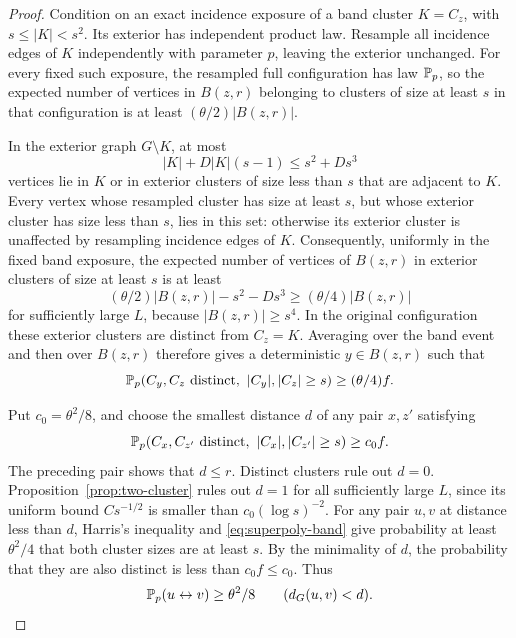 \begin{proof}
Condition on an exact incidence exposure of a band cluster
$K=C_z$, with $s\le|K|<s^2$. Its exterior has independent product law.
Resample all incidence edges of $K$ independently with parameter $p$,
leaving the exterior unchanged. For every fixed such exposure, the
resampled full configuration has law $\mathbb P_p$, so the expected number
of vertices in $B(z,r)$ belonging to clusters of size at least $s$
in that configuration is at least
$(\theta/2)|B(z,r)|$.

In the exterior graph $G\setminus K$, at most
\[
 |K|+D|K|(s-1)\le s^2+Ds^3
\]
vertices lie in $K$ or in exterior clusters of size less than $s$
that are adjacent to $K$. Every vertex whose resampled cluster has
size at least $s$, but whose exterior cluster has size less than $s$,
lies in this set: otherwise its exterior cluster is unaffected by
resampling incidence edges of $K$. Consequently, uniformly in the
fixed band exposure, the expected number of vertices of $B(z,r)$
in exterior clusters of size at least $s$ is at least
\[
 (\theta/2)|B(z,r)|-s^2-Ds^3
 \ge(\theta/4)|B(z,r)|
\]
for sufficiently large $L$, because $|B(z,r)|\ge s^4$.
In the original configuration these exterior clusters are distinct
from $C_z=K$. Averaging over the band event and then over $B(z,r)$
therefore gives a deterministic $y\in B(z,r)$ such that
\[
 \PP_p(C_y,C_z\text{ distinct},\ |C_y|,|C_z|\ge s)
 \ge(\theta/4)f.
\]

Put $c_0=\theta^2/8$, and choose the smallest distance $d$ of any pair
$x,z'$ satisfying
\begin{equation}\label{eq:superpoly-separated-pair}
 \mathbb P_p(C_x,C_{z'}\text{ distinct},\ |C_x|,|C_{z'}|\ge s)
 \ge c_0 f.
\end{equation}
The preceding pair shows that $d\le r$. Distinct clusters rule out
$d=0$. Proposition~\ref{prop:two-cluster} rules out $d=1$ for all
sufficiently large $L$, since its uniform bound $Cs^{-1/2}$ is smaller
than $c_0(\log s)^{-2}$.
For any pair $u,v$ at distance less than $d$, Harris's inequality and
\eqref{eq:superpoly-band} give probability at least $\theta^2/4$ that
both cluster sizes are at least $s$. By the minimality of $d$, the
probability that they are also distinct is less than $c_0f\le c_0$.
Thus
\begin{equation}\label{eq:superpoly-short-connections}
 \mathbb P_p(u\leftrightarrow v)\ge\theta^2/8
 \qquad(d_G(u,v)<d).
\end{equation}


\end{proof}
